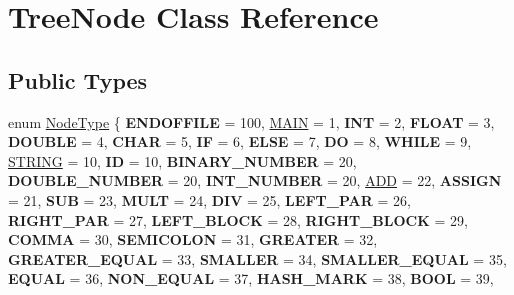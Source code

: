 \hypertarget{class_tree_node}{}\section{Tree\+Node Class Reference}
\label{class_tree_node}
\subsection*{Public Types}
\begin{DoxyCompactItemize}
\item 
enum \hyperlink{class_tree_node_a62f65fbb26a3d18a773f8e7f201303b3}{Node\+Type} \{ \newline
{\bfseries E\+N\+D\+O\+F\+F\+I\+LE} = 100, 
\hyperlink{class_tree_node_a62f65fbb26a3d18a773f8e7f201303b3a8fe6cd5b7bb583a57703ed4083cd55fa}{M\+A\+IN} = 1, 
{\bfseries I\+NT} = 2, 
{\bfseries F\+L\+O\+AT} = 3, 
\newline
{\bfseries D\+O\+U\+B\+LE} = 4, 
{\bfseries C\+H\+AR} = 5, 
{\bfseries IF} = 6, 
{\bfseries E\+L\+SE} = 7, 
\newline
{\bfseries DO} = 8, 
{\bfseries W\+H\+I\+LE} = 9, 
\hyperlink{class_tree_node_a62f65fbb26a3d18a773f8e7f201303b3a8526948dee4855c6ea6d49dca25b79ff}{S\+T\+R\+I\+NG} = 10, 
{\bfseries ID} = 10, 
\newline
{\bfseries B\+I\+N\+A\+R\+Y\+\_\+\+N\+U\+M\+B\+ER} = 20, 
{\bfseries D\+O\+U\+B\+L\+E\+\_\+\+N\+U\+M\+B\+ER} = 20, 
{\bfseries I\+N\+T\+\_\+\+N\+U\+M\+B\+ER} = 20, 
\hyperlink{class_tree_node_a62f65fbb26a3d18a773f8e7f201303b3a8c682e3267299864062c35947b16776f}{A\+DD} = 22, 
\newline
{\bfseries A\+S\+S\+I\+GN} = 21, 
{\bfseries S\+UB} = 23, 
{\bfseries M\+U\+LT} = 24, 
{\bfseries D\+IV} = 25, 
\newline
{\bfseries L\+E\+F\+T\+\_\+\+P\+AR} = 26, 
{\bfseries R\+I\+G\+H\+T\+\_\+\+P\+AR} = 27, 
{\bfseries L\+E\+F\+T\+\_\+\+B\+L\+O\+CK} = 28, 
{\bfseries R\+I\+G\+H\+T\+\_\+\+B\+L\+O\+CK} = 29, 
\newline
{\bfseries C\+O\+M\+MA} = 30, 
{\bfseries S\+E\+M\+I\+C\+O\+L\+ON} = 31, 
{\bfseries G\+R\+E\+A\+T\+ER} = 32, 
{\bfseries G\+R\+E\+A\+T\+E\+R\+\_\+\+E\+Q\+U\+AL} = 33, 
\newline
{\bfseries S\+M\+A\+L\+L\+ER} = 34, 
{\bfseries S\+M\+A\+L\+L\+E\+R\+\_\+\+E\+Q\+U\+AL} = 35, 
{\bfseries E\+Q\+U\+AL} = 36, 
{\bfseries N\+O\+N\+\_\+\+E\+Q\+U\+AL} = 37, 
\newline
{\bfseries H\+A\+S\+H\+\_\+\+M\+A\+RK} = 38, 
{\bfseries B\+O\+OL} = 39, 

\end{DoxyCompactItemize}

